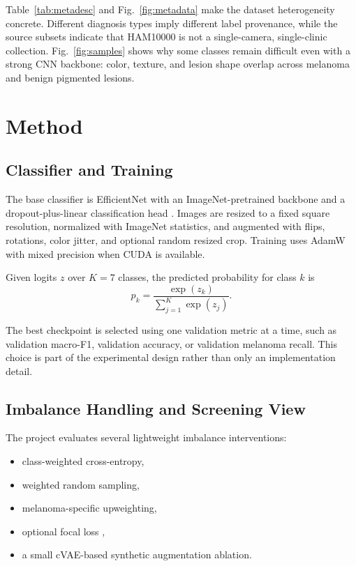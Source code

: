 \documentclass[conference]{IEEEtran}
\begin{document}
Table~\ref{tab:metadesc} and Fig.~\ref{fig:metadata} make the dataset heterogeneity concrete. Different diagnosis types imply different label provenance, while the source subsets indicate that HAM10000 is not a single-camera, single-clinic collection. Fig.~\ref{fig:samples} shows why some classes remain difficult even with a strong CNN backbone: color, texture, and lesion shape overlap across melanoma and benign pigmented lesions.

\section{Method}
\subsection{Classifier and Training}
The base classifier is EfficientNet with an ImageNet-pretrained backbone and a dropout-plus-linear classification head \cite{tan2019efficientnet}. Images are resized to a fixed square resolution, normalized with ImageNet statistics, and augmented with flips, rotations, color jitter, and optional random resized crop. Training uses AdamW \cite{loshchilov2019adamw} with mixed precision when CUDA is available.

Given logits $z$ over $K=7$ classes, the predicted probability for class $k$ is
\begin{equation}
p_k = \frac{\exp(z_k)}{\sum_{j=1}^{K}\exp(z_j)}.
\end{equation}

The best checkpoint is selected using one validation metric at a time, such as validation macro-F1, validation accuracy, or validation melanoma recall. This choice is part of the experimental design rather than only an implementation detail.

\subsection{Imbalance Handling and Screening View}
The project evaluates several lightweight imbalance interventions:
\begin{itemize}
\item class-weighted cross-entropy,
\item weighted random sampling,
\item melanoma-specific upweighting,
\item optional focal loss \cite{lin2017focal},
\item a small cVAE-based synthetic augmentation ablation.
\end{itemize}
\end{document}
